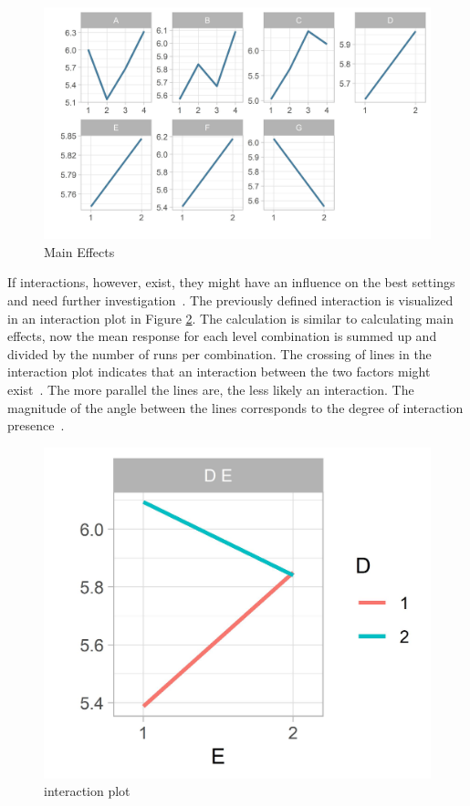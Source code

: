 \begin{figure}[ht] 
	\includegraphics[width=1\linewidth]{simulations/taguchi/plots/main_effects}
	\caption{Main Effects}
	\label{fig:hyperparam_tuning:main_effects}
\end{figure}


 If interactions, however, exist, they might have an influence on the best settings and need further investigation~\cite{yang_design_2009}. The previously defined interaction is visualized in an interaction plot in Figure \ref{fig:hyperparam_tuning:interaction_plot}. The calculation is similar to calculating main effects, now the mean response for each level combination is summed up and divided by the number of runs per combination. The crossing of lines in the interaction plot indicates that an interaction between the two factors might exist~\cite{field_discovering_2012}. The more parallel the lines are, the less likely an interaction. The magnitude of the angle between the lines corresponds to the degree of interaction presence~\cite{roy_primer_1990}.

\begin{figure}[ht] 
	\centering
	\includegraphics[width=0.4\linewidth]{simulations/taguchi/plots/test_of_interaction}
	\caption{interaction plot}
	\label{fig:hyperparam_tuning:interaction_plot}
\end{figure}

